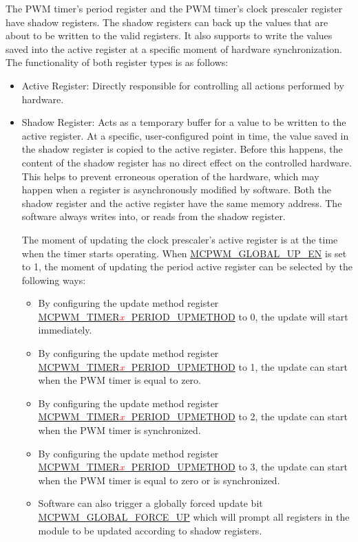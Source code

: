 \documentclass[main\_\_EN.tex]{subfiles}
\begin{document}
The PWM timer's period register and the PWM timer's clock prescaler register have shadow registers. The shadow registers can back up the values that are about to be written to the valid registers. It also supports to write the values saved into the active register at a specific moment of hardware synchronization. The functionality of both register types is as follows:
\begin{itemize}
    \item Active Register: Directly responsible for controlling all actions performed by hardware. 
    \item Shadow Register: Acts as a temporary buffer for a value to be written to the active register. At a specific, user-configured point in time, the value saved in the shadow register is copied to the active register. Before this happens, the content of the shadow register has no direct effect on the controlled hardware. This helps to prevent erroneous operation of the hardware, which may happen when a register is asynchronously modified by software. Both the shadow register and the active register have the same memory address. The software always writes into, or reads from the shadow register. 
    
    The moment of updating the clock prescaler's active register is at the time when the timer starts operating. When \hyperref[fielddesc:MCPWMGLOBALUPEN]{MCPWM\_GLOBAL\_UP\_EN} is set to 1, the moment of updating the period active register can be selected by the following ways:
    
    \begin{itemize}
    \item By configuring the update method register \hyperref[fielddesc:MCPWMTIMER0PERIODUPMETHOD]{MCPWM\_TIMER\textcolor{red}{\it{x}}\_PERIOD\_UPMETHOD} to 0, the update will start immediately.
    \item By configuring the update method register \hyperref[fielddesc:MCPWMTIMER0PERIODUPMETHOD]{MCPWM\_TIMER\textcolor{red}{\it{x}}\_PERIOD\_UPMETHOD} to 1, the update can start when the PWM timer is equal to zero.
    \item By configuring the update method register \hyperref[fielddesc:MCPWMTIMER0PERIODUPMETHOD]{MCPWM\_TIMER\textcolor{red}{\it{x}}\_PERIOD\_UPMETHOD} to 2, the update can start when the PWM timer is synchronized.
    \item By configuring the update method register \hyperref[fielddesc:MCPWMTIMER0PERIODUPMETHOD]{MCPWM\_TIMER\textcolor{red}{\it{x}}\_PERIOD\_UPMETHOD} to 3, the update can start when the PWM timer is equal to zero or is synchronized.
    \item Software can also trigger a globally forced update bit\\ \hyperref[fielddesc:MCPWMGLOBALFORCEUP]{MCPWM\_GLOBAL\_FORCE\_UP} which will prompt all registers in the module to be updated according to shadow registers.
    \end{itemize}
\end{itemize}
\end{document}
